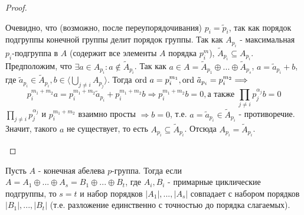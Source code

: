 \begin{proof}
\begin{itemize}
        Очевидно, что (возможно, после переупорядочивания) $p_i = \tilde{p}_i$, так как порядок подгруппы конечной группы делит порядок группы. Так как $A_{p_i}$ - максимальная $p_i$-подгруппа в $A$ (содержит все элементы $A$ порядка $p_i^m$), $\tilde{A}_{p_i} \subseteq A_{p_i}$.\\
        Предположим, что $\exists a \in A_{p_i}: a \notin \tilde{A}_{p_i}$. Так как $a \in A = \tilde{A}_{p_1} \oplus ... \oplus \tilde{A}_{p_s}$, $a = \tilde{a}_{p_i} + b$, где $\tilde{a}_{p_i} \in \tilde{A}_{p_i}, b \in \langle \bigcup \limits_{j \neq i} A_{p_j} \rangle$. Тогда $\textup{ord } a = p_i^{m_1}, \textup{ord } \tilde{a}_{p_i} = p_i^{m_2} \Longrightarrow$
        \[ p_i^{m_1 + m_2}a = p_i^{m_1 + m_2}\tilde{a}_{p_i} + p_i^{m_1 + m_2}b \Longrightarrow p_i^{m_1 + m_2}b = 0, \text{а также } \prod \limits_{j \neq i} p_j^{\alpha_j} b = 0\]
        $\prod \limits_{j \neq i} p_j^{\alpha_j}$ и $p_i^{m_1+m_2}$ взаимно просты $\Longrightarrow b = 0$, т.е. $a = \tilde{a}_{p_i} \in \tilde{A}_{p_i}$ - противоречие.\\
        Значит, такого $a$ не существует, то есть $A_{p_i} \subseteq \tilde{A}_{p_i}$. Отсюда $A_{p_i} = \tilde{A}_{p_i}$.
    \end{itemize}
\end{proof}
\begin{lemmanum}
    Пусть $A$ - конечная абелева $p$-группа. Тогда если $A = A_1 \oplus ... \oplus A_s = B_1 \oplus ... \oplus B_t$, где $A_i, B_i$ - примарные циклические подгруппы, то $s = t$ и набор порядков $|A_1|,...,|A_s|$ совпадает с набором порядков $|B_1|,...,|B_t|$ (т.е. разложение единственно с точностью до порядка слагаемых).
\end{lemmanum}

